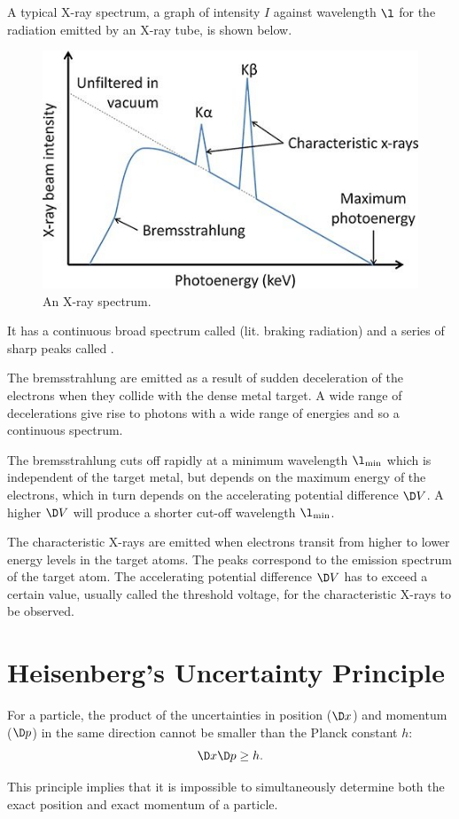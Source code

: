 A typical X-ray spectrum, a graph of intensity $I$ against wavelength $\l$ for the radiation emitted by an X-ray tube, is shown below.

\begin{figure}[H]
    \centering
    \includegraphics[scale=0.5]{media/X-Ray Spectrum.jpg}
    \caption{An X-ray spectrum.\protect\footnotemark}
\end{figure}

It has a continuous broad spectrum called  (lit. braking radiation) and a series of sharp peaks called .

The bremsstrahlung are emitted as a result of sudden deceleration of the electrons when they collide with the dense metal target. A wide range of decelerations give rise to photons with a wide range of energies and so a continuous spectrum.

The bremsstrahlung cuts off rapidly at a minimum wavelength $\l_{\text{min}}$ which is independent of the target metal, but depends on the maximum energy of the electrons, which in turn depends on the accelerating potential difference $\D V$. A higher $\D V$ will produce a shorter cut-off wavelength $\l_{\text{min}}$.

The characteristic X-rays are emitted when electrons transit from higher to lower energy levels in the target atoms. The peaks correspond to the emission spectrum of the target atom. The accelerating potential difference $\D V$ has to exceed a certain value, usually called the threshold voltage, for the characteristic X-rays to be observed.

\section{Heisenberg's Uncertainty Principle}

\begin{principle}
    For a particle, the product of the uncertainties in position ($\D x$) and momentum ($\D p$) in the same direction cannot be smaller than the Planck constant $h$: \[\D x \D p \geq h.\]
\end{principle}

This principle implies that it is impossible to simultaneously determine both the exact position and exact momentum of a particle.